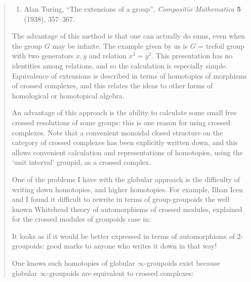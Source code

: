 \documentclass{article}
\def\tightlist{}
\renewcommand{\texttt}[1]{%
  \begingroup
  \ttfamily
  \begingroup\lccode`~=`/\lowercase{\endgroup\def~}{/\discretionary{}{}{}}%
  \begingroup\lccode`~=`[\lowercase{\endgroup\def~}{[\discretionary{}{}{}}%
  \begingroup\lccode`~=`.\lowercase{\endgroup\def~}{.\discretionary{}{}{}}%
  \catcode`/=\active\catcode`[=\active\catcode`.=\active
  \scantokens{#1\noexpand}%
  \endgroup
}
\begin{document}
\begin{quote}
\begin{enumerate}
\def\labelenumi{\arabic{enumi})}
\setcounter{enumi}{22}
\tightlist
\item
  Alan Turing, ``The extensions of a group'', \emph{Compositio
  Mathematica} \textbf{5} (1938), 357--367.
\end{enumerate}

The advantage of this method is that one can actually do sums, even when
the group \(G\) may be infinite. The example given by us is \(G\) =
trefoil group with two generators \(x,y\) and relation \(x^3=y^2\). This
presentation has no identities among relations, and so the calculation
is especially simple. Equivalence of extensions is described in terms of
homotopies of morphisms of crossed complexes, and this relates the ideas
to other forms of homological or homotopical algebra.

An advantage of this approach is the ability to calculate some small
free crossed resolutions of some groups: this is one reason for using
crossed complexes. Note that a convenient monoidal closed structure on
the category of crossed complexes has been explicitly written down, and
this allows convenient calculation and representations of homotopies,
using the `unit interval' groupid, as a crossed complex.

One of the problems I have with the globular approach is the difficulty
of writing down homotopies, and higher homotopies. For example, Ilhan
Icen and I found it difficult to rewrite in terms of group-groupoids the
well known Whitehead theory of automorphisms of crossed modules,
explained for the crossed modules of groupoids case in:


It looks as if it would be better expressed in terms of automorphisms of
\(2\)-groupoids: good marks to anyone who writes it down in that way!

One knows such homotopies of globular \(\infty\)-groupoids exist because
globular \(\infty\)-groupoids are equivalent to crossed complexes:


\end{quote}
\end{document}
